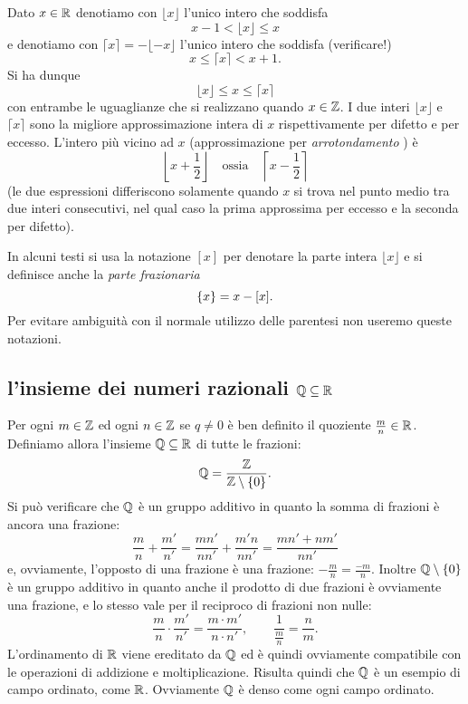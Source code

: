 \begin{definition}
  \mymark{**}%
%
  Dato $x\in {\mathbb R}$ denotiamo con $\lfloor x\rfloor$ l'unico intero
  che soddisfa
  \mymargin{$\lfloor\cdot\rfloor$} %
  \[
    x - 1 < \lfloor x \rfloor \le x
  \]
  e denotiamo con $\lceil x \rceil = - \lfloor -x \rfloor$ l'unico intero che soddisfa (verificare!)
  \mymargin{$\lceil\cdot\rceil$} %
  \[
    x \le \lceil x \rceil < x + 1.
  \]
  Si ha dunque
  \[
    \lfloor x \rfloor \le x \le \lceil x \rceil
  \]
  con entrambe le uguaglianze che si realizzano quando $x\in {\mathbb Z}$.
  I due interi $\lfloor x \rfloor$ e $\lceil x \rceil$
  sono la migliore approssimazione intera di $x$ rispettivamente
  per difetto e per eccesso.
  L'intero più vicino ad $x$ (approssimazione per \emph{arrotondamento}%
%
)
  è
  \[
    \left\lfloor x + \frac 1 2 \right\rfloor
  \quad \text{ossia} \quad
    \left\lceil x-\frac 1 2 \right\rceil
  \]
  (le due espressioni differiscono solamente quando $x$ si trova nel punto medio tra 
  due interi consecutivi, nel qual caso la prima approssima per eccesso e la seconda 
  per difetto).
\end{definition}

In alcuni testi si usa la notazione $[x]$ per denotare la parte intera $\lfloor x \rfloor$ e si definisce
anche la \emph{parte frazionaria}
\[
  {\left\{ x \right\}} = x - [x].
\]
Per evitare ambiguità con il normale utilizzo delle parentesi
non useremo queste notazioni.

\subsection{l'insieme dei numeri razionali ${\mathbb Q}\subseteq {\mathbb R}$}
%
%
%
%
\index{$\QQ$}%

Per ogni $m\in {\mathbb Z}$ ed ogni $n\in {\mathbb Z}$ se $q\neq 0$ è ben
definito il quoziente $\frac m n\in {\mathbb R}$.
Definiamo allora l'insieme ${\mathbb Q}\subseteq {\mathbb R}$ di tutte le frazioni:
\[
    {\mathbb Q} = \frac{{\mathbb Z}}{{\mathbb Z}\setminus{\left\{ 0 \right\}}}.
\]
Si può verificare che $\QQ$ è un gruppo additivo in quanto 
la somma di frazioni è ancora una frazione:
\[
  \frac{m}{n} + \frac{m'}{n'}
  = \frac{mn'}{nn'} + \frac{m'n}{nn'} 
  = \frac{mn'+nm'}{n n'}
\]
e, ovviamente, l'opposto di una frazione è una frazione: 
$- \frac m n = \frac{-m}{n}$. 
Inoltre ${\mathbb Q}\setminus {\left\{ 0 \right\}}$ è un gruppo 
additivo in quanto anche il prodotto di due frazioni 
è ovviamente una frazione, e lo stesso vale per il reciproco di frazioni 
non nulle:
\[
  \frac{m}{n}\cdot \frac{m'}{n'} = \frac{m\cdot m'}{n\cdot n'},
  \qquad
  \frac{1}{\frac m n} = \frac n m.  
\]
L'ordinamento di ${\mathbb R}$ viene ereditato da $\QQ$ ed è quindi ovviamente 
compatibile con le operazioni di addizione e moltiplicazione. 
Risulta quindi che $\QQ$ è un esempio di campo ordinato, come ${\mathbb R}$.
Ovviamente $\QQ$ è denso come ogni campo ordinato.

